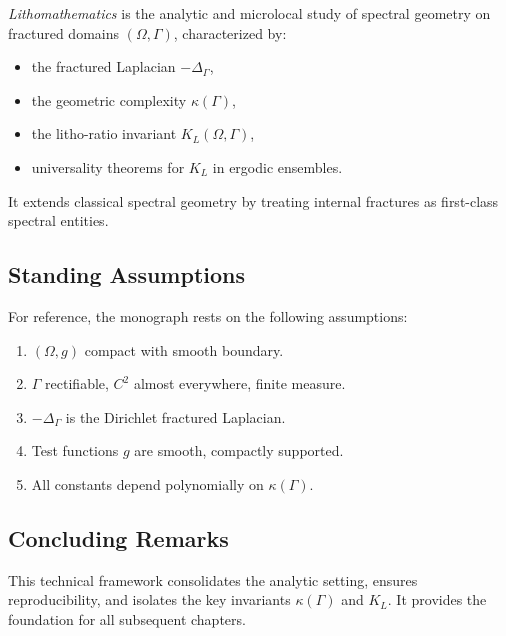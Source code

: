 \begin{definition}[Lithomathematics]
\emph{Lithomathematics} is the analytic and microlocal study of spectral
geometry on fractured domains $(\Omega,\Gamma)$, characterized by:
\begin{itemize}
  \item the fractured Laplacian $-\Delta_\Gamma$,
  \item the geometric complexity $\kappa(\Gamma)$,
  \item the litho-ratio invariant $K_L(\Omega,\Gamma)$,
  \item universality theorems for $K_L$ in ergodic ensembles.
\end{itemize}
It extends classical spectral geometry by treating internal fractures as
first-class spectral entities.
\end{definition}

\subsection{Standing Assumptions}

For reference, the monograph rests on the following assumptions:

\begin{enumerate}[label=(S\arabic*)]
  \item $(\Omega,g)$ compact with smooth boundary.
  \item $\Gamma$ rectifiable, $C^2$ almost everywhere, finite measure.
  \item $-\Delta_\Gamma$ is the Dirichlet fractured Laplacian.
  \item Test functions $g$ are smooth, compactly supported.
  \item All constants depend polynomially on $\kappa(\Gamma)$.
\end{enumerate}

\subsection{Concluding Remarks}

This technical framework consolidates the analytic setting, ensures
reproducibility, and isolates the key invariants $\kappa(\Gamma)$ and $K_L$.
It provides the foundation for all subsequent chapters.


